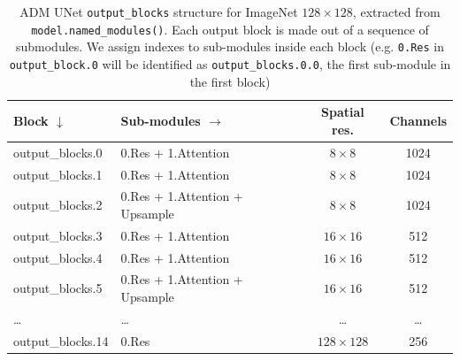 

\begin{table}[!htbp]
\centering
\caption{ADM UNet \texttt{output\_blocks} structure for ImageNet $128\times128$,
         extracted from \texttt{model.named\_modules()}.
         Each output block is made out of a sequence of submodules.
         We assign indexes to sub-modules inside each block (e.g. \texttt{0.Res} in \texttt{output\_block.0} will be identified as \texttt{output\_blocks.0.0}, the first sub-module in the first block)}
\label{tab:adm-unet-decoder}
\begin{tabular}{llcc}
\toprule
\textbf{Block} $\downarrow$ & \textbf{Sub-modules} $\rightarrow$ & \textbf{Spatial res.} & \textbf{Channels}\\
\midrule
output\_blocks.0  & 0.Res + 1.Attention & $8\times8$     & 1024  \\
output\_blocks.1  & 0.Res + 1.Attention & $8\times8$     & 1024  \\
output\_blocks.2  & 0.Res + 1.Attention + Upsample   & $8\times8$     & 1024 \\
\midrule
output\_blocks.3  & 0.Res + 1.Attention & $16\times16$   & 512 \\
output\_blocks.4  & 0.Res + 1.Attention & $16\times16$   & 512 \\
output\_blocks.5  & 0.Res + 1.Attention + Upsample   & $16\times16$   & 512 \\
\midrule
\dots & \dots & \dots & \dots\\
output\_blocks.14 & 0.Res & $128\times128$ & 256  \\
\bottomrule
\end{tabular}
\end{table}

